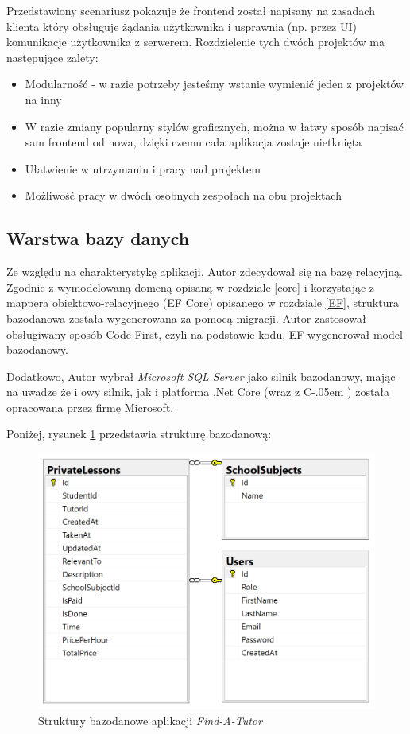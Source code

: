 \documentclass[12pt]{article}
\newcommand{\Csharp}{%
  {\settoheight{\dimen0}{C}C\kern-.05em \resizebox{!}{\dimen0}{\raisebox{\depth}{\# }}}}
\numberwithin{figure}{section}
\begin{document}
\begin{sloppypar}
Przedstawiony scenariusz pokazuje że frontend został napisany na zasadach klienta który obsługuje żądania użytkownika i usprawnia (np. przez UI) komunikacje użytkownika z serwerem. 
Rozdzielenie tych dwóch projektów ma następujące zalety:
\begin{itemize}
    \item Modularność - w razie potrzeby jesteśmy wstanie wymienić jeden z projektów na inny
    \item W razie zmiany popularny stylów graficznych, można w łatwy sposób napisać sam frontend od nowa, dzięki czemu cała aplikacja zostaje nietknięta
    \item Ułatwienie w utrzymaniu i pracy nad projektem
    \item Możliwość pracy w dwóch osobnych zespołach na obu projektach
\end{itemize}
    

\subsection{Warstwa bazy danych}
Ze względu na charakterystykę aplikacji, Autor zdecydował się na bazę relacyjną.
Zgodnie z wymodelowaną domeną opisaną w rozdziale \ref{core} i korzystając z mappera obiektowo-relacyjnego (EF Core) opisanego w rozdziale \ref{EF}, struktura bazodanowa została wygenerowana za pomocą migracji. Autor zastosował obsługiwany sposób Code First, czyli na podstawie kodu, EF wygenerował model bazodanowy.
    
Dodatkowo, Autor wybrał \textit{Microsoft SQL Server} jako silnik bazodanowy, mając na uwadze że i owy silnik, jak i platforma .Net Core (wraz z \Csharp) została opracowana przez firmę Microsoft. 
    
Poniżej, rysunek \ref{fig:db} przedstawia strukturę bazodanową: 
\begin{figure}[H] 
    \centering
    \includegraphics[width=.8\textwidth]{images/chapter_3/db.png}
    \caption{Struktury bazodanowe aplikacji \textit{Find-A-Tutor}}
    \label{fig:db}
\end{figure}
    

\end{sloppypar}
\end{document}
